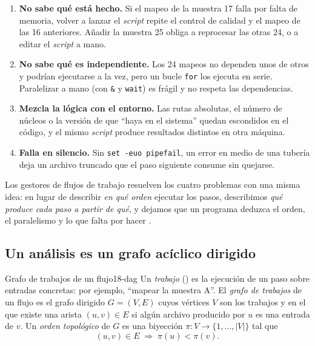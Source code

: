 \begin{enumerate}
  \item \textbf{No sabe qué está hecho.} Si el mapeo de la muestra 17 falla por falta de memoria, volver a lanzar el \emph{script} repite el control de calidad y el mapeo de las 16 anteriores. Añadir la muestra 25 obliga a reprocesar las otras 24, o a editar el \emph{script} a mano.
  \item \textbf{No sabe qué es independiente.} Los 24 mapeos no dependen unos de otros y podrían ejecutarse a la vez, pero un bucle \texttt{for} los ejecuta en serie. Paralelizar a mano (con \texttt{\&} y \texttt{wait}) es frágil y no respeta las dependencias.
  \item \textbf{Mezcla la lógica con el entorno.} Las rutas absolutas, el número de núcleos o la versión de  que ``haya en el sistema'' quedan escondidos en el código, y el mismo \emph{script} produce resultados distintos en otra máquina.
  \item \textbf{Falla en silencio.} Sin \texttt{set -euo pipefail}, un error en medio de una tubería deja un archivo truncado que el paso siguiente consume sin quejarse.
\end{enumerate}

Los gestores de flujos de trabajo resuelven los cuatro problemas con una misma idea: en lugar de describir \emph{en qué orden} ejecutar los pasos, describimos \emph{qué produce cada paso a partir de qué}, y dejamos que un programa deduzca el orden, el paralelismo y lo que falta por hacer \parencite{c18-wratten2021}.

\subsection{Un análisis es un grafo acíclico dirigido}

\begin{definicion}{Grafo de trabajos de un flujo}{18-dag}
Un \emph{trabajo} () es la ejecución de un paso sobre entradas concretas: por ejemplo, ``mapear la muestra A''. El \emph{grafo de trabajos} de un flujo es el grafo dirigido $G=(V,E)$ cuyos vértices $V$ son los trabajos y en el que existe una arista $(u,v)\in E$ si algún archivo producido por $u$ es una entrada de $v$. Un \emph{orden topológico} de $G$ es una biyección $\pi:V\to\{1,\dots,|V|\}$ tal que
\begin{equation}\label{eq:18-topo}
(u,v)\in E \;\Longrightarrow\; \pi(u) < \pi(v).
\end{equation}
\end{definicion}

